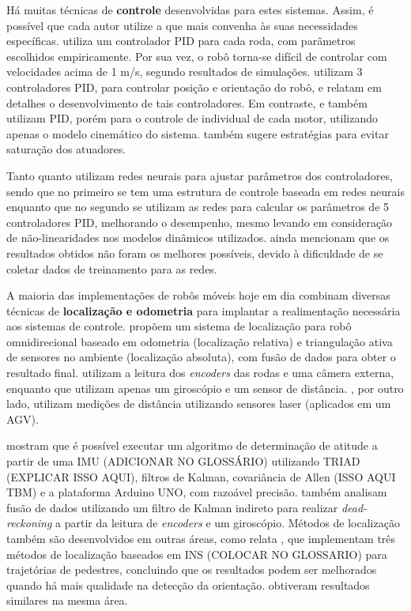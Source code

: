 Há muitas técnicas de \textbf{controle} desenvolvidas para estes sistemas. Assim, é possível que cada autor utilize a que mais convenha às suas necessidades específicas. \cite{ritter2016modelagem} utiliza um controlador PID para cada roda, com parâmetros escolhidos empiricamente. Por sua vez, o robô torna-se difícil de controlar com velocidades acima de 1 m/s, segundo resultados de simulações. \cite{samani2007comprehensive} utilizam 3 controladores PID, para controlar posição e orientação do robô, e relatam em detalhes o desenvolvimento de tais controladores. Em contraste, \cite{rojas2006holonomic} e \cite{indiveri2009swedish} também utilizam PID, porém para o controle de individual de cada motor, utilizando apenas o modelo cinemático do sistema. \cite{indiveri2009swedish} também sugere estratégias para evitar saturação dos atuadores.

Tanto \cite{treesatayapun2011discrete} quanto \cite{oubbati2005velocity} utilizam redes neurais para ajustar parâmetros dos controladores, sendo que no primeiro se tem uma estrutura de controle baseada em redes neurais enquanto que no segundo se utilizam as redes para calcular os parâmetros de 5 controladores PID, melhorando o desempenho, mesmo levando em consideração de não-linearidades nos modelos dinâmicos utilizados. \cite{oubbati2005velocity} ainda mencionam que os resultados obtidos não foram os melhores possíveis, devido à dificuldade de se coletar dados de treinamento para as redes.

A maioria das implementações de robôs móveis hoje em dia combinam diversas técnicas de \textbf{localização e odometria} para implantar a realimentação necessária aos sistemas de controle. \cite{ginzburg2013indoor} propõem um sistema de localização para robô omnidirecional baseado em odometria (localização relativa) e triangulação ativa de sensores no ambiente (localização absoluta), com fusão de dados para obter o resultado final. \cite{rojas2006holonomic} utilizam a leitura dos \emph{encoders} das rodas e uma câmera externa, enquanto que \cite{garcia2015gyro} utilizam apenas um giroscópio e um sensor de distância. \cite{rohrig2010laser}, por outro lado, utilizam medições de distância utilizando sensores laser (aplicados em um AGV).

\cite{lowcostIMU} mostram que é possível executar um algoritmo de determinação de atitude a partir de uma IMU (ADICIONAR NO GLOSSÁRIO) utilizando TRIAD (EXPLICAR ISSO AQUI), filtros de Kalman, covariância de Allen (ISSO AQUI TBM) e a plataforma Arduino UNO, com razoável precisão. \cite{park1996dead} também analisam fusão de dados utilizando um filtro de Kalman indireto para realizar \emph{dead-reckoning} a partir da leitura de \emph{encoders} e um giroscópio. Métodos de localização também são desenvolvidos em outras áreas, como relata \cite{jimenez2009comparison}, que implementam três métodos de localização baseados em INS (COLOCAR NO GLOSSARIO) para trajetórias de pedestres, concluindo que os resultados podem ser melhorados quando há mais qualidade na detecção da orientação. \cite{steinhoff2010pocket} obtiveram resultados similares na mesma área.

